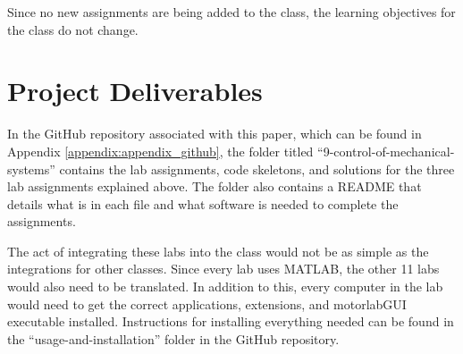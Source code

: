 Since no new assignments are being added to the class, the learning objectives for the class do not change.

\section{Project Deliverables}

In the GitHub repository associated with this paper, which can be found in Appendix \ref{appendix:appendix_github},
the folder titled ``9-control-of-mechanical-systems'' contains the lab assignments, code skeletons, and solutions for the three
lab assignments explained above. The folder also contains a README that details what is in each file and what software is needed 
to complete the assignments. 

The act of integrating these labs into the class would not be as simple as the integrations for other classes. Since every lab 
uses MATLAB, the other 11 labs would also need to be translated. In addition to this, every computer in the lab would need to 
get the correct applications, extensions, and motorlabGUI executable installed. Instructions for installing everything needed 
can be found in the ``usage-and-installation'' folder in the GitHub repository.
